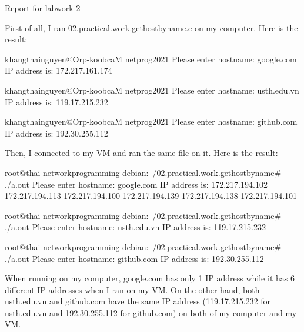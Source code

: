 Report for labwork 2

First of all, I ran 02.practical.work.gethostbyname.c on my computer.
Here is the result:

khangthainguyen@Orp-koobcaM netprog2021 %
 Please enter hostname: 
google.com
IP address is: 
172.217.161.174

khangthainguyen@Orp-koobcaM netprog2021 %
 Please enter hostname: 
usth.edu.vn
IP address is: 
119.17.215.232

khangthainguyen@Orp-koobcaM netprog2021 %
 Please enter hostname: 
github.com
IP address is: 
192.30.255.112


Then, I connected to my VM and ran the same file on it. 
Here is the result:

root@thai-networkprogramming-debian:~/02.practical.work.gethostbyname# ./a.out
 Please enter hostname: 
google.com
IP address is: 
172.217.194.102
172.217.194.113
172.217.194.100
172.217.194.139
172.217.194.138
172.217.194.101

root@thai-networkprogramming-debian:~/02.practical.work.gethostbyname# ./a.out
 Please enter hostname: 
usth.edu.vn
IP address is: 
119.17.215.232

root@thai-networkprogramming-debian:~/02.practical.work.gethostbyname# ./a.out
 Please enter hostname: 
github.com
IP address is: 
192.30.255.112

When running on my computer, google.com has only 1 IP address while it has 6 different IP addresses when I ran on my VM.
On the other hand, both usth.edu.vn and github.com have the same IP address (119.17.215.232 for usth.edu.vn and 192.30.255.112
for github.com) on both of my computer and my VM.